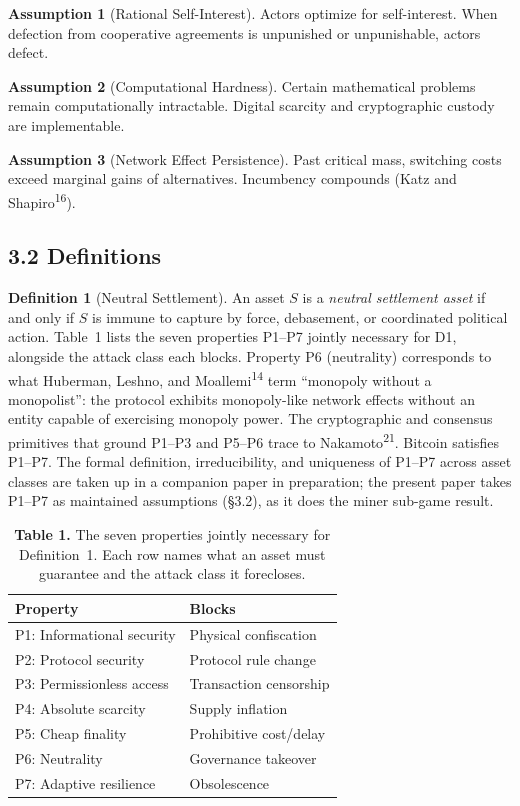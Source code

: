 \documentclass[12pt]{article}
\theoremstyle{definition}
\newtheorem{definition}{Definition}
\newtheorem{assumption}{Assumption}
\theoremstyle{remark}
\begin{document}
\begin{assumption}[Rational Self-Interest]
Actors optimize for self-interest. When defection from cooperative
agreements is unpunished or unpunishable, actors defect.
\end{assumption}

\begin{assumption}[Computational Hardness]
Certain mathematical problems remain computationally intractable.
Digital scarcity and cryptographic custody are implementable.
\end{assumption}

\begin{assumption}[Network Effect Persistence]
Past critical mass, switching costs exceed marginal gains of
alternatives. Incumbency compounds (Katz and
Shapiro\textsuperscript{16}).
\end{assumption}

\subsection{3.2 Definitions}

\begin{definition}[Neutral Settlement]
An asset $S$ is a \emph{neutral settlement asset} if and only if $S$ is immune to capture by force, debasement, or coordinated political action. Table~1 lists the seven properties P1--P7 jointly necessary for D1, alongside the attack class each blocks. Property P6 (neutrality) corresponds to what Huberman, Leshno, and Moallemi\textsuperscript{14} term ``monopoly without a monopolist'': the protocol exhibits monopoly-like network effects without an entity capable of exercising monopoly power. The cryptographic and consensus primitives that ground P1--P3 and P5--P6 trace to Nakamoto\textsuperscript{21}. Bitcoin satisfies P1--P7. The formal definition, irreducibility, and uniqueness of P1--P7 across asset classes are taken up in a companion paper in preparation; the present paper takes P1--P7 as maintained assumptions (\S3.2), as it does the miner sub-game result.
\end{definition}

\begin{table}[h]
\centering
\caption*{\textbf{Table 1.} The seven properties jointly necessary for Definition~1. Each row names what an asset must guarantee and the attack class it forecloses.}
\begin{tabular}{ll}
\toprule
Property & Blocks \\
\midrule
P1: Informational security & Physical confiscation \\
P2: Protocol security & Protocol rule change \\
P3: Permissionless access & Transaction censorship \\
P4: Absolute scarcity & Supply inflation \\
P5: Cheap finality & Prohibitive cost/delay \\
P6: Neutrality & Governance takeover \\
P7: Adaptive resilience & Obsolescence \\
\bottomrule
\end{tabular}
\end{table}
\end{document}
